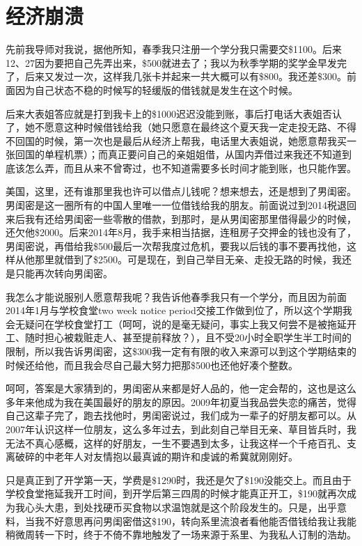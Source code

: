 \documentclass[12pt]{book}
\begin{document}
\chapter{经济崩溃}
\label{sec-38}
先前我导师对我说，据他所知，春季我只注册一个学分我只需要交\$1100。后来12、27因为要把自己先弄出来，\$500就进去了；我以为秋季学期的奖学金早发完了，后来又发过一次，这样我几张卡并起来一共大概可以有\$800。我还差\$300。前面因为自己状态不稳的时候写的轻缓版的借钱就是发生在这个时候。

后来大表姐答应就是打到我卡上的\$1000迟迟没能到账，事后打电话大表姐否认了，她不愿意这种时候借钱给我（她只愿意在最终这个夏天我一定走投无路、不得不回国的时候，第一次也是最后从经济上帮我，电话里大表姐说，她愿意帮我买一张回国的单程机票）；而真正要问自己的亲姐姐借，从国内弄借过来我还不知道到底该怎么弄，而且从来不曾寄过，也不知道需要多长时间才能到账，也只能作罢。

美国，这里，还有谁那里我也许可以借点儿钱呢？想来想去，还是想到了男闺密。男闺密是这一圈所有的中国人里唯一一位借钱给我的朋友。前面说过到2014税退回来后我有还给男闺密一些零散的借款，到那时，是从男闺密那里借得最少的时候，还欠他\$2000。后来2014年8月，我手来相当拮据，连租房子交押金的钱也没有了，男闺密说，再借给我\$500最后一次帮我度过危机，要我以后钱的事不要再找他，这样从他那里就借到了\$2500。可是现在，到自己举目无亲、走投无路的时候，我还是只能再次转向男闺密。

我怎么才能说服别人愿意帮我呢？我告诉他春季我只有一个学分，而且因为前面2014年1月与学校食堂two week notice period交接工作做到位了，所以这个学期我会无疑问在学校食堂打工（呵呵，说的是毫无疑问，事实上我又何尝不是被拖延开工、随时担心被栽赃走人、甚至提前释放？），且不受20小时全职学生半工时间的限制，所以我告诉男闺密，这\$300我一定有有限的收入来源可以到这个学期结束的时候还给他，而且我会尽自己最大努力把那\$500也还他好凑个整数。

呵呵，答案是大家猜到的，男闺密从来都是好人品的，他一定会帮的，这也是这么多年来他成为我在美国最好的朋友的原因。2009年初夏当我品尝失恋的痛苦，觉得自己这辈子完了，跑去找他时，男闺密说过，我们成为一辈子的好朋友都可以。从2007年认识这样一位朋友，这么多年过去，到此刻自己举目无亲、草目皆兵时，我无法不真心感概，这样的好朋友，一生不要遇到太多，让我这样一个千疮百孔、支离破碎的中老年人对友情抱以最真诚的期许和虔诚的希冀就刚刚好。

只是真正到了开学第一天，学费是\$1290时，我还是欠了\$190没能交上。而且由于学校食堂拖延我开工时间，到开学后第三四周的时候才能真正开工，\$190就再次成为我心头大患，到处找硬币买食物以求温饱就是这个阶段发生的。只是，出乎意料，当我不好意思再问男闺密借这\$190，转向系里流浪者看他能否借钱给我让我能稍微周转一下时，终于不倚不靠地触发了一场来源于系里、为我私人订制的浩劫。
\end{document}
